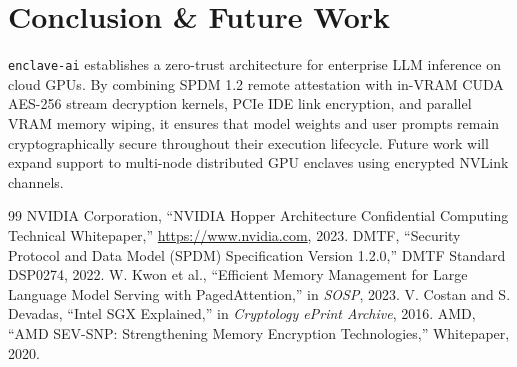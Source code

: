 \documentclass[11pt,a4paper]{article}
\begin{document}
\section{Conclusion \& Future Work}
\texttt{enclave-ai} establishes a zero-trust architecture for enterprise LLM inference on cloud GPUs. By combining SPDM 1.2 remote attestation with in-VRAM CUDA AES-256 stream decryption kernels, PCIe IDE link encryption, and parallel VRAM memory wiping, it ensures that model weights and user prompts remain cryptographically secure throughout their execution lifecycle. Future work will expand support to multi-node distributed GPU enclaves using encrypted NVLink channels.

\begin{thebibliography}{99}
 NVIDIA Corporation, ``NVIDIA Hopper Architecture Confidential Computing Technical Whitepaper,'' \url{https://www.nvidia.com}, 2023.
 DMTF, ``Security Protocol and Data Model (SPDM) Specification Version 1.2.0,'' DMTF Standard DSP0274, 2022.
 W. Kwon et al., ``Efficient Memory Management for Large Language Model Serving with PagedAttention,'' in \emph{SOSP}, 2023.
 V. Costan and S. Devadas, ``Intel SGX Explained,'' in \emph{Cryptology ePrint Archive}, 2016.
 AMD, ``AMD SEV-SNP: Strengthening Memory Encryption Technologies,'' Whitepaper, 2020.
\end{thebibliography}
\end{document}
